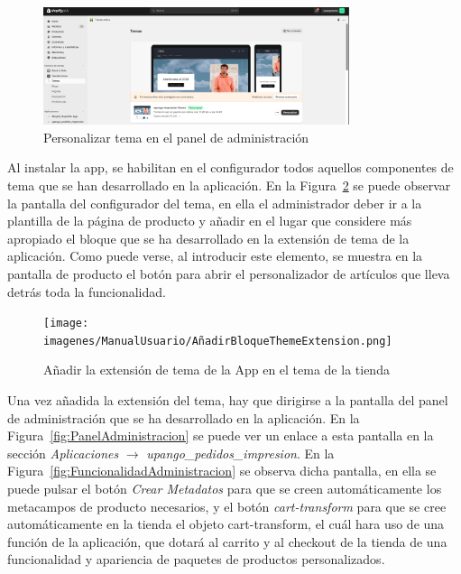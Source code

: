 \documentclass[12pt]{article}
\begin{document}
\begin{figure}[ht]
    \centering
    \includegraphics[width=0.8\textwidth]{imagenes/ManualUsuario/PantallaDePersonalizarTema.png}
    \caption{\label{fig:PersonalizarTema}Personalizar tema en el panel de administración}
    \vspace{\fill}
\end{figure}

Al instalar la app, se habilitan en el configurador todos aquellos componentes de tema que se han desarrollado en la aplicación.
En la Figura~\ref{fig:ThemeAppExtension} se puede observar la pantalla del configurador del tema, en ella el administrador deber ir a la plantilla de la página de producto y añadir
en el lugar que considere más apropiado el bloque que se ha desarrollado en la extensión de tema de la aplicación. Como puede verse, al introducir este elemento, se muestra en la pantalla de producto
el botón para abrir el personalizador de artículos que lleva detrás toda la funcionalidad.

\begin{figure}[ht]
    \centering
    \texttt{[image: imagenes/ManualUsuario/AñadirBloqueThemeExtension.png]}
    \caption{\label{fig:ThemeAppExtension}Añadir la extensión de tema de la App en el tema de la tienda}
    \vspace{\fill}
\end{figure}

Una vez añadida la extensión del tema, hay que dirigirse a la pantalla del panel de administración que se ha desarrollado en la aplicación. En la Figura~\ref{fig:PanelAdministracion} se puede
ver un enlace a esta pantalla en la sección \textit{Aplicaciones} $\rightarrow$  \textit{upango\_pedidos\_impresion}. En la Figura~\ref{fig:FuncionalidadAdministracion} se observa dicha pantalla, en ella se puede pulsar el botón \textit{Crear Metadatos} para que se creen 
automáticamente los metacampos de producto necesarios, y el botón \textit{cart-transform} para que se cree automáticamente en la tienda el objeto cart-transform, el cuál hara uso de una función de la aplicación, que 
dotará al carrito y al checkout de la tienda de una funcionalidad y apariencia de paquetes de productos personalizados.
\end{document}
